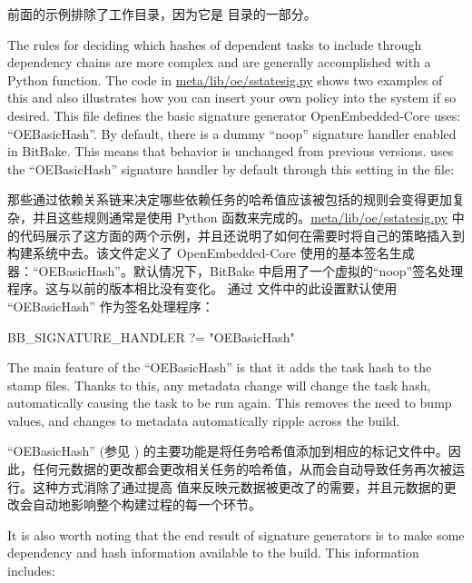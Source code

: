 前面的示例排除了工作目录，因为它是  目录的一部分。

The rules for deciding which hashes of dependent tasks to include through dependency chains are more complex and are generally accomplished with a Python function. The code in \href{https://git.yoctoproject.org/poky/tree/meta/lib/oe/sstatesig.py}{meta/lib/oe/sstatesig.py} shows two examples of this and also illustrates how you can insert your own policy into the system if so desired. This file defines the basic signature generator OpenEmbedded-Core uses: ``OEBasicHash''. By default, there is a dummy ``noop'' signature handler enabled in BitBake. This means that behavior is unchanged from previous versions.  uses the ``OEBasicHash'' signature handler by default through this setting in the  file:

那些通过依赖关系链来决定哪些依赖任务的哈希值应该被包括的规则会变得更加复杂，并且这些规则通常是使用 Python 函数来完成的。\href{https://git.yoctoproject.org/poky/tree/meta/lib/oe/sstatesig.py}{meta/lib/oe/sstatesig.py} 中的代码展示了这方面的两个示例，并且还说明了如何在需要时将自己的策略插入到构建系统中去。该文件定义了 OpenEmbedded-Core 使用的基本签名生成器：``OEBasicHash''。默认情况下，BitBake 中启用了一个虚拟的``noop''签名处理程序。这与以前的版本相比没有变化。 通过  文件中的此设置默认使用 ``OEBasicHash'' 作为签名处理程序：

\begin{pyglist}
BB_SIGNATURE_HANDLER ?= "OEBasicHash"
\end{pyglist}

The main feature of the ``OEBasicHash''  is that it adds the task hash to the stamp files. Thanks to this, any metadata change will change the task hash, automatically causing the task to be run again. This removes the need to bump  values, and changes to metadata automatically ripple across the build.

``OEBasicHash'' (参见 ) 的主要功能是将任务哈希值添加到相应的标记文件中。因此，任何元数据的更改都会更改相关任务的哈希值，从而会自动导致任务再次被运行。这种方式消除了通过提高  值来反映元数据被更改了的需要，并且元数据的更改会自动地影响整个构建过程的每一个环节。

It is also worth noting that the end result of signature generators is to make some dependency and hash information available to the build. This information includes:

